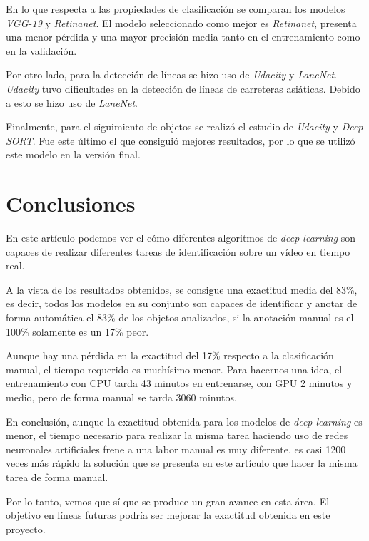 \documentclass[a4paper, 11pt]{memoir}
\begin{document}
	En lo que respecta a las propiedades de clasificación se comparan los modelos \emph{VGG-19} y
	\emph{Retinanet}. El modelo seleccionado como mejor es \emph{Retinanet}, presenta una menor
	pérdida y una mayor precisión media tanto en el entrenamiento como en la validación.

	Por otro lado, para la detección de líneas se hizo uso de \emph{Udacity} y \emph{LaneNet}.
	\emph{Udacity} tuvo dificultades en la detección de líneas de carreteras asiáticas. Debido
	a esto se hizo uso de \emph{LaneNet}.

	Finalmente, para el siguimiento de objetos se realizó el estudio de \emph{Udacity} y 
	\emph{Deep SORT}. Fue este último el que consiguió mejores resultados, por lo que se utilizó
	este modelo en la versión final.
	
	\section{Conclusiones}
	En este artículo podemos ver el cómo diferentes algoritmos de \emph{deep learning} son capaces
	de realizar diferentes tareas de identificación sobre un vídeo en tiempo real.

	A la vista de los resultados obtenidos, se consigue una exactitud media del 83\%, es decir,
	todos los modelos en su conjunto son capaces de identificar y anotar de forma automática el 
	83\% de los objetos analizados, si la anotación manual es el 100\% solamente es un 17\% peor.

	Aunque hay una pérdida en la exactitud del 17\% respecto a la clasificación manual, el tiempo
	requerido es muchísimo menor. Para hacernos una idea, el entrenamiento con CPU tarda 43
	minutos en entrenarse, con GPU 2 minutos y medio, pero de forma manual se tarda 3060 minutos.

	En conclusión, aunque la exactitud obtenida para los modelos de \emph{deep learning} es menor,
	el tiempo necesario para realizar la misma tarea haciendo uso de redes neuronales artificiales 
	frene a una labor manual es muy diferente, es casi 1200 veces más rápido la solución
	que se presenta en este artículo que hacer la misma tarea de forma manual.

	Por lo tanto, vemos que sí que se produce un gran avance en esta área. El objetivo en líneas 
	futuras podría ser mejorar la exactitud obtenida en este proyecto.

	
	
\end{document}
